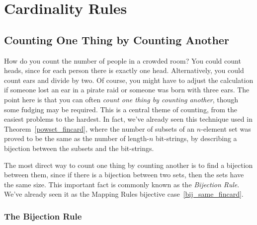 \chapter{Cardinality Rules}\label{counting_chap}

\newcommand{\Jay}{Bob}
\newcommand{\Jer}{Ted}

\begin{editingnotes}
\end{editingnotes}

\section{Counting One Thing by Counting Another}\label{bijection_counting_sec}

How do you count the number of people in a crowded room?  You could
count heads, since for each person there is exactly one head.
Alternatively, you could count ears and divide by two.  Of course, you
might have to adjust the calculation if someone lost an ear in a
pirate raid or someone was born with three ears.  The point here is
that you can often \emph{count one thing by counting another}, though
some fudging may be required.  This is a central theme of
counting, from the easiest problems to the hardest.  In fact, we've
already seen this technique used in Theorem~\ref{powset_fincard}, where
the number of subsets of an $n$-element set was proved to be the same as
the number of length-$n$ bit-strings, by describing a bijection%
between the subsets and the bit-strings.

The most direct way to count one thing by counting another is to find
a bijection between them, since if there is a bijection between two
sets, then the sets have the same size.  This important fact is
commonly known as the%
\emph{Bijection Rule}.  We've already seen it as
the Mapping Rules bijective case~\eqref{bij_same_fincard}.

\subsection{The Bijection Rule}\label{sec:donut_bij}

\iffalse
\begin{rul}[Bijection Rule]\label{rul:bijection}
If there is a bijection $f: A \to B$ between $A$ and~$B$, then
$\card{A} = \card{B}$.
\end{rul}
\fi

